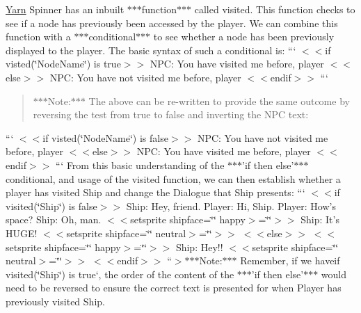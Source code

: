 \hyperlink{a00045}{Yarn} Spinner has an inbuilt $\ast$$\ast$$\ast$function$\ast$$\ast$$\ast$ called {\ttfamily visited}. This function checks to see if a node has previously been accessed by the player. We can combine this function with a $\ast$$\ast$$\ast$conditional$\ast$$\ast$$\ast$ to see whether a node has been previously displayed to the player. The basic syntax of such a conditional is\-: ``` $<$$<$if visted(\char`\"{}\-Node\-Name\char`\"{}) is true$>$$>$ N\-P\-C\-: You have visited me before, player $<$$<$else$>$$>$ N\-P\-C\-: You have not visited me before, player $<$$<$endif$>$$>$ ``` \begin{quotation}
$\ast$$\ast$$\ast$\-Note\-:$\ast$$\ast$$\ast$ The above can be re-\/written to provide the same outcome by reversing the test from true to false and inverting the N\-P\-C text\-:

\end{quotation}
``` $<$$<$if visted(\char`\"{}\-Node\-Name\char`\"{}) is false$>$$>$ N\-P\-C\-: You have not visited me before, player $<$$<$else$>$$>$ N\-P\-C\-: You have visited me before, player $<$$<$endif$>$$>$ ``` From this basic understanding of the $\ast$$\ast$$\ast$'if then else'$\ast$$\ast$$\ast$ conditional, and usage of the {\ttfamily visited} function, we can then establish whether a player has visited Ship and change the Dialogue that Ship presents\-: ``` $<$$<$if visited(\char`\"{}\-Ship\char`\"{}) is false$>$$>$ Ship\-: Hey, friend. Player\-: Hi, Ship. Player\-: How's space? Ship\-: Oh, man. $<$$<$setsprite shipface=\char`\"{}\char`\"{} happy$>$=\char`\"{}\char`\"{}$>$$>$ Ship\-: It's H\-U\-G\-E! $<$$<$setsprite shipface=\char`\"{}\char`\"{} neutral$>$=\char`\"{}\char`\"{}$>$$>$ $<$$<$else$>$$>$ $<$$<$setsprite shipface=\char`\"{}\char`\"{} happy$>$=\char`\"{}\char`\"{}$>$$>$ Ship\-: Hey!! $<$$<$setsprite shipface=\char`\"{}\char`\"{} neutral$>$=\char`\"{}\char`\"{}$>$$>$ $<$$<$endif$>$$>$ ``{\ttfamily  $>$$\ast$$\ast$$\ast$\-Note\-:$\ast$$\ast$$\ast$ Remember, if we have}if visited(\char`\"{}\-Ship\char`\"{}) is true`, the order of the content of the $\ast$$\ast$$\ast$'if then else'$\ast$$\ast$$\ast$ would need to be reversed to ensure the correct text is presented for when Player has previously visited Ship.

